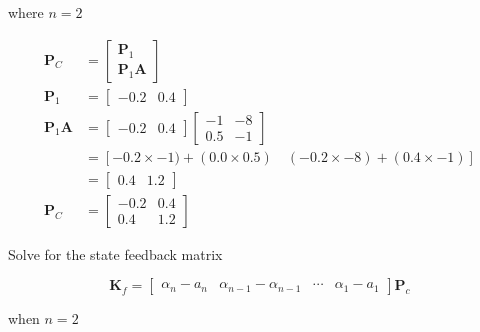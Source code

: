 \documentclass[main.tex]{subfiles}
\begin{document}
\begin{enumerate}
\begin{enumerate}
        where $n=2$

        $$
        \begin{aligned}
        \textbf{P}_C & =\left[\begin{array}{l}
        \textbf{P}_1 \\
        \textbf{P}_1 \textbf{A}
        \end{array}\right] \\
        \textbf{P}_1 & =\left[\begin{array}{ll}
        -0.2 & 0.4
        \end{array}\right] \\
        \textbf{P}_1 \textbf{A} & =\left[\begin{array}{ll}
        -0.2 & 0.4
        \end{array}\right]\left[\begin{array}{cc}
        -1 & -8 \\
        0.5 & -1
        \end{array}\right] \\
        & =[-0.2 \times-1)+(0.0 \times 0.5) \quad (-0.2 \times-8)+(0.4 \times-1)] \\
        & =\left[\begin{array}{ll}
        0.4 & 1.2
        \end{array}\right] \\
        \textbf{P}_C & =\left[\begin{array}{ll}
        -0.2 & 0.4 \\
        0.4 & 1.2
        \end{array}\right]
        \end{aligned}
        $$

        Solve for the state feedback matrix

        $$
        \textbf{K}_f=\left[\begin{array}{llll}
        \alpha_n-a_n & \alpha_{n-1}-\alpha_{n-1} & \cdots & \alpha_1-a_1
        \end{array}\right] \textbf{P}_c
        $$

        when $n=2$


\end{enumerate}
\end{enumerate}
\end{document}
